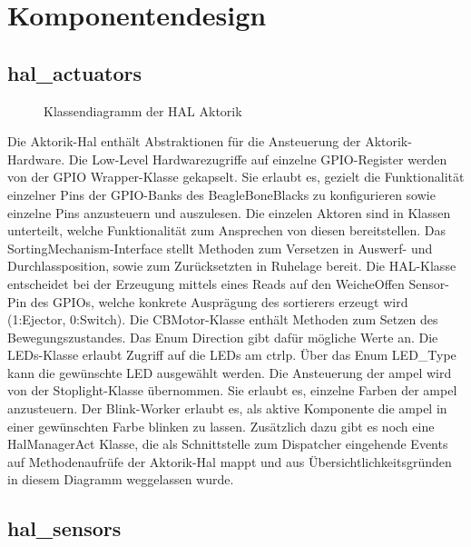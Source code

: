 \section{Komponentendesign}\label{sec:komponentendesign}

\subsection{hal\_actuators}\label{subsec:hal_actuators}

\begin{figure}[h]
    \caption{Klassendiagramm der HAL Aktorik}
    \label{fig:cd-hal}
\end{figure}

Die Aktorik-Hal enthält Abstraktionen für die Ansteuerung der Aktorik-Hardware.
Die Low-Level Hardwarezugriffe auf einzelne GPIO-Register werden von der GPIO Wrapper-Klasse gekapselt.
Sie erlaubt es, gezielt die Funktionalität einzelner Pins der GPIO-Banks des BeagleBoneBlacks zu
konfigurieren sowie einzelne Pins anzusteuern und auszulesen. Die einzelen Aktoren sind in Klassen unterteilt,
welche Funktionalität zum Ansprechen von diesen bereitstellen.
Das SortingMechanism-Interface stellt Methoden zum Versetzen in Auswerf- und Durchlassposition,
sowie zum Zurücksetzten in Ruhelage bereit. Die HAL-Klasse entscheidet bei der Erzeugung mittels
eines Reads auf den WeicheOffen Sensor-Pin des GPIOs, welche konkrete Ausprägung des \gls{sortierer}s erzeugt wird
(1:Ejector, 0:Switch).
Die CBMotor-Klasse enthält Methoden zum Setzen des Bewegungszustandes. Das Enum Direction gibt dafür mögliche Werte an.
Die LEDs-Klasse erlaubt Zugriff auf die LEDs am \gls{ctrlp}. Über das Enum LED\_Type kann die gewünschte LED ausgewählt werden.
Die Ansteuerung der \gls{ampel} wird von der Stoplight-Klasse übernommen. Sie erlaubt es, einzelne Farben der \gls{ampel} anzusteuern.
Der Blink-Worker erlaubt es, als aktive Komponente die \gls{ampel} in einer gewünschten Farbe blinken zu lassen.
Zusätzlich dazu gibt es noch eine HalManagerAct Klasse, die als Schnittstelle zum Dispatcher eingehende Events auf Methodenaufrüfe der Aktorik-Hal
mappt und aus Übersichtlichkeitsgründen in diesem Diagramm weggelassen wurde.

\subsection{hal\_sensors}\label{subsec:hal_sensors}

